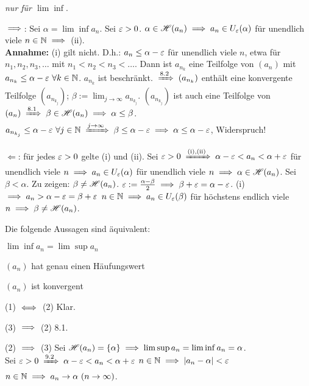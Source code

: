 \documentclass[a4paper,oneside,DIV15,BCOR12mm]{scrbook}
\begin{document}
\begin{beweis}
\textit{nur für $\lim\inf$}.

\glqq$\implies$\grqq: Sei $\alpha = \lim\inf a_n$. Sei $\varepsilon > 0 $. $\alpha\in\mathscr{H}(a_n) \implies a_n \in U_\varepsilon(\alpha)$ für unendlich viele $n\in\mathbb{N} \implies$ (ii). \\
\textbf{Annahme:} (i) gilt nicht. D.h.: $a_n \le \alpha - \varepsilon$ für unendlich viele $n$, etwa für $n_1, n_2, n_3,\ldots$ mit $n_1 < n_2 < n_3 <\ldots$. Dann ist $a_{n_k}$ eine Teilfolge von $(a_n)$ mit $a_{n_k} \le \alpha-\varepsilon \ \forall k \in\mathbb{N}$. $a_{n_k}$ ist beschränkt. $\folgtwegen{8.2} (a_{n_k})$ enthält eine konvergente Teilfolge $(a_{n_{k_j}})$; $\displaystyle\beta := \lim_{j\to\infty} a_{n_{k_j}}$. $(a_{n_{k_j}})$ ist auch eine Teilfolge von $(a_n) \folgtwegen{8.1} \beta \in\H(a_n) \folgt \alpha \le \beta$. $a_{n_{k_j}} \le \alpha -\ep \ \forall j \in\MdN \folgtwegen{j\to\infty} \beta \le \alpha-\ep \folgt \alpha \le \alpha - \ep$, Widerspruch!

\glqq$\Leftarrow$\grqq: für jedes $\varepsilon>0$ gelte (i) und (ii). Sei $\ep>0\folgtnach{(i),(ii)} \alpha -\ep < a_n < \alpha+\ep$ für unendlich viele $n \implies a_n\in U_\varepsilon(\alpha)$ für unendlich viele $n \implies \alpha \in \mathscr{H}(a_n)$. Sei $\beta < \alpha$. Zu zeigen: $\beta \ne \mathscr{H}(a_n)$.  $\varepsilon := \frac{\alpha -\beta}{2} \implies \beta + \varepsilon = \alpha - \varepsilon$. (i) $\implies a_n > \alpha - \varepsilon = \beta + \varepsilon$ \ffa $n\in\mathbb{N} \implies a_n\in U_\varepsilon(\beta)$ für höchstens endlich viele $n \implies \beta \ne \mathscr{H}(a_n)$.
\end{beweis}

\begin{satz}
Die folgende  Aussagen sind äquivalent:
\begin{liste}
\item $\lim\inf a_n = \lim\sup a_n$
\item $(a_n)$ hat genau einen Häufungswert
\item $(a_n)$ ist konvergent
\end{liste}
\end{satz}

\begin{beweise}
\item{(1) $\iff$ (2)} Klar.
\item{(3) $\implies$ (2)} 8.1.
\item{(2) $\implies$ (3)} Sei $\mathscr{H}(a_n) = \{\alpha\} \implies \lim\sup a_n = \lim\inf a_n = \alpha$.\\
Sei $\ep>0 \folgtnach{9.2} \alpha - \ep < a_n < \alpha + \ep$ \ffa $n\in\mathbb{N} \implies |a_n- \alpha| < \varepsilon$ \ffa $n\in\MdN \folgt a_n\to\alpha \ (n\to\infty)$.
\end{beweise}
\end{document}
